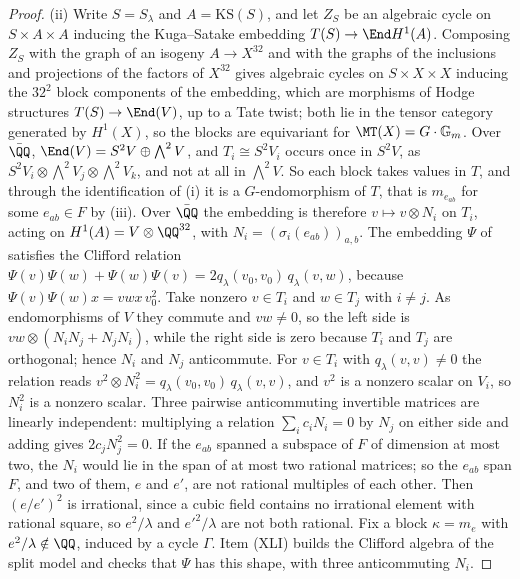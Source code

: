 \begin{proof}
(ii) Write $S=S_{\lambda}$ and $A=\mathrm{KS}(S)$, and let $Z_{S}$ be an
algebraic cycle on $S\times A\times A$ inducing the Kuga--Satake embedding
$T(S)\to\End H^{1}(A)$. Composing $Z_{S}$ with the graph of an isogeny
$A\to X^{32}$ and with the graphs of the inclusions and projections of the
factors of $X^{32}$ gives algebraic cycles on $S\times X\times X$ inducing the
$32^{2}$ block components of the embedding, which are morphisms of Hodge
structures $T(S)\to\End(V)$, up to a Tate twist; both lie in the tensor
category generated by $H^{1}(X)$, so the blocks are equivariant for
$\MT(X)=G\cdot\mathbb{G}_{m}$. Over $\bar{\QQ}$,
$\End(V)=S^{2}V\oplus\bigwedge^{2}V$, and $T_{i}\cong S^{2}V_{i}$ occurs once
in $S^{2}V$, as $S^{2}V_{i}\otimes\bigwedge^{2}V_{j}\otimes\bigwedge^{2}V_{k}$,
and not at all in $\bigwedge^{2}V$. So each block takes values in $T$, and
through the identification of (i) it is a $G$-endomorphism of $T$, that is
$m_{e_{ab}}$ for some $e_{ab}\in F$ by (iii). Over
$\bar{\QQ}$ the embedding is therefore $v\mapsto v\otimes N_{i}$ on $T_{i}$,
acting on $H^{1}(A)=V\otimes\QQ^{32}$, with
$N_{i}=(\sigma_{i}(e_{ab}))_{a,b}$. The embedding $\Psi$ of
 satisfies the Clifford relation
$\Psi(v)\Psi(w)+\Psi(w)\Psi(v)=2q_{\lambda}(v_{0},v_{0})\,q_{\lambda}(v,w)$,
because
$\Psi(v)\Psi(w)x=vwx\,v_{0}^{2}$. Take nonzero $v\in T_{i}$ and
$w\in T_{j}$ with $i\ne j$. As endomorphisms of $V$ they commute and $vw\ne0$,
so the left side is $vw\otimes(N_{i}N_{j}+N_{j}N_{i})$, while the right side
is zero because $T_{i}$ and $T_{j}$ are orthogonal; hence $N_{i}$ and $N_{j}$
anticommute. For $v\in T_{i}$ with $q_{\lambda}(v,v)\ne0$ the relation reads
$v^{2}\otimes N_{i}^{2}=q_{\lambda}(v_{0},v_{0})\,q_{\lambda}(v,v)$, and $v^{2}$
is a nonzero scalar on $V_{i}$, so $N_{i}^{2}$ is a nonzero scalar. Three pairwise
anticommuting invertible matrices are linearly independent: multiplying a
relation $\sum_{i}c_{i}N_{i}=0$ by $N_{j}$ on either side and adding gives
$2c_{j}N_{j}^{2}=0$. If the $e_{ab}$ spanned a subspace of $F$ of dimension at
most two, the $N_{i}$ would lie in the span of at most two rational matrices;
so the $e_{ab}$ span $F$, and two of them, $e$ and $e'$, are not rational
multiples of each other. Then $(e/e')^{2}$ is irrational, since a cubic field
contains no irrational element with rational square, so $e^{2}/\lambda$ and
$e'^{2}/\lambda$ are not both rational. Fix a block $\kappa=m_{e}$ with
$e^{2}/\lambda\notin\QQ$, induced by a cycle $\Gamma$. Item (XLI) builds the
Clifford algebra of the split model and checks that $\Psi$ has this shape,
with three anticommuting $N_{i}$.


\end{proof}
